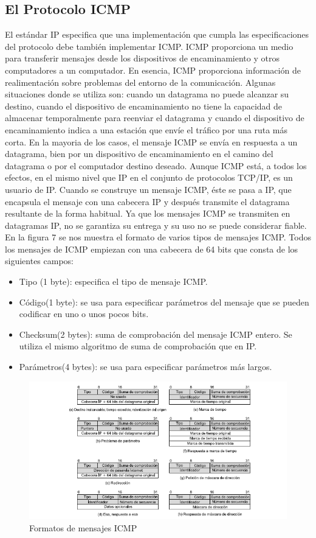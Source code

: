 	\subsection{El Protocolo ICMP}
	El est\'andar IP especifica que una implementaci\'on que cumpla las especificaciones del protocolo debe tambi\'en implementar ICMP. ICMP proporciona un medio para transferir mensajes desde los dispositivos de encaminamiento y otros computadores a un computador. En esencia, ICMP proporciona informaci\'on de realimentaci\'on sobre problemas del entorno de la comunicaci\'on. Algunas situaciones donde se utiliza son: cuando un datagrama no puede alcanzar su destino, cuando el dispositivo de encaminamiento no tiene la capacidad de almacenar temporalmente para reenviar el datagrama y cuando el dispositivo de encaminamiento indica a una estaci\'on que env\'ie el tr\'afico por una ruta m\'as corta. En la mayoria de los casos, el mensaje ICMP se env\'ia en respuesta a un datagrama, bien por un dispositivo de encaminamiento en el camino del datagrama o por el computador destino deseado. 
\vskip 1pt
Aunque ICMP est\'a, a todos los efectos, en el mismo nivel que IP en el conjunto de protocolos TCP/IP, es un usuario de IP. Cuando se construye un mensaje ICMP, \'este se pasa a IP, que encapsula el mensaje con una cabecera IP y despu\'es transmite el datagrama resultante de la forma habitual. Ya que los mensajes ICMP se transmiten en datagramas IP, no se garantiza su entrega y su uso no se puede considerar fiable.
\vskip 1pt
	En la figura 7 se nos muestra el formato de varios tipos de mensajes ICMP. Todos los mensajes de ICMP empiezan con una cabecera de 64 bits que consta de los siguientes campos: 
	\begin{itemize}
		\item Tipo (1 byte): especifica el tipo de mensaje ICMP.
		\item C\'odigo(1 byte): se usa para especificar par\'ametros del mensaje que se pueden codificar en uno o unos pocos bits.
		\item Checksum(2 bytes): suma de comprobaci\'on del mensaje ICMP entero. Se utiliza el mismo algoritmo de suma de comprobaci\'on que en IP.
		\item Par\'ametros(4 bytes): se usa para especificar par\'ametros m\'as largos.
	\end{itemize}
	\begin{figure}[h]
			\centering		
			\includegraphics[width=\textwidth]{CabeceraICMP}
			\caption{Formatos de mensajes ICMP}
	\end{figure}
